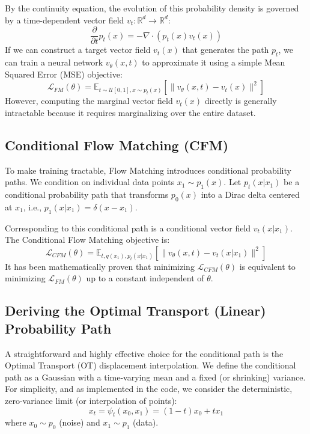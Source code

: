 \documentclass[12pt]{article}
\begin{document}
By the continuity equation, the evolution of this probability density is governed by a time-dependent vector field $v_t: \mathbb{R}^d \rightarrow \mathbb{R}^d$:
\begin{equation}
    \frac{\partial}{\partial t} p_t(x) = -\nabla \cdot (p_t(x) v_t(x))
\end{equation}
If we can construct a target vector field $v_t(x)$ that generates the path $p_t$, we can train a neural network $v_\theta(x, t)$ to approximate it using a simple Mean Squared Error (MSE) objective:
\begin{equation}
    \mathcal{L}_{FM}(\theta) = \mathbb{E}_{t \sim \mathcal{U}[0,1], x \sim p_t(x)} \left[ \| v_\theta(x, t) - v_t(x) \|^2 \right]
\end{equation}
However, computing the marginal vector field $v_t(x)$ directly is generally intractable because it requires marginalizing over the entire dataset.

\subsection{Conditional Flow Matching (CFM)}
To make training tractable, Flow Matching introduces conditional probability paths. We condition on individual data points $x_1 \sim p_1(x)$. Let $p_t(x | x_1)$ be a conditional probability path that transforms $p_0(x)$ into a Dirac delta centered at $x_1$, i.e., $p_1(x | x_1) = \delta(x - x_1)$. 

Corresponding to this conditional path is a conditional vector field $v_t(x | x_1)$. The Conditional Flow Matching objective is:
\begin{equation}
    \mathcal{L}_{CFM}(\theta) = \mathbb{E}_{t, q(x_1), p_t(x | x_1)} \left[ \| v_\theta(x, t) - v_t(x | x_1) \|^2 \right]
\end{equation}
It has been mathematically proven that minimizing $\mathcal{L}_{CFM}(\theta)$ is equivalent to minimizing $\mathcal{L}_{FM}(\theta)$ up to a constant independent of $\theta$.

\subsection{Deriving the Optimal Transport (Linear) Probability Path}
A straightforward and highly effective choice for the conditional path is the Optimal Transport (OT) displacement interpolation. We define the conditional path as a Gaussian with a time-varying mean and a fixed (or shrinking) variance. For simplicity, and as implemented in the code, we consider the deterministic, zero-variance limit (or interpolation of points):
\begin{equation}
    x_t = \psi_t(x_0, x_1) = (1 - t)x_0 + t x_1
\end{equation}
where $x_0 \sim p_0$ (noise) and $x_1 \sim p_1$ (data). 
\end{document}
